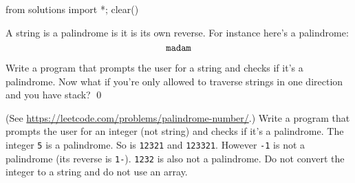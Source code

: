 \begin{python0}
from solutions import *; clear()
\end{python0}

A string is a palindrome is it is its own reverse.
For instance here's a palindrome:
\[
\text{\texttt{madam}}
\]

\begin{ex}
Write a program that prompts the user for a string
and checks if it's a palindrome.
Now what if you're only allowed to traverse strings in one direction
and you have stack?
\qed
\end{ex}

\begin{ex}
(See \url{https://leetcode.com/problems/palindrome-number/}.)
Write a program that prompts the user for an integer (not string)
and checks if it's a palindrome.
The integer \verb!5! is a palindrome.
So is
\verb!12321! and 
\verb!123321!.
However \verb!-1! is not a palindrome (its reverse is \verb!1-!).
\verb!1232! is also not a palindrome.
Do not convert the integer to a string and do not use an array.
\end{ex}

